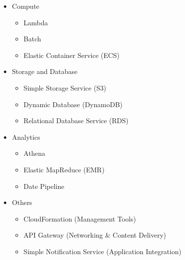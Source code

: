 \begin{itemize}
    \item Compute
    \begin{itemize}
        \item Lambda
        \item Batch
        \item Elastic Container Service (ECS)
    \end{itemize}
    \item Storage and Database
    \begin{itemize}
        \item Simple Storage Service (S3)
        \item Dynamic Database (DynamoDB)
        \item Relational Database Service (RDS)
    \end{itemize}
    \item Analytics
    \begin{itemize}
        \item Athena
        \item Elastic MapReduce (EMR)
        \item Date Pipeline
    \end{itemize}
    \item Others
    \begin{itemize}
        \item CloudFormation (Management Tools)
        \item API Gateway (Networking \& Content Delivery)
        \item Simple Notification Service (Application Integration)
    \end{itemize}
\end{itemize}



